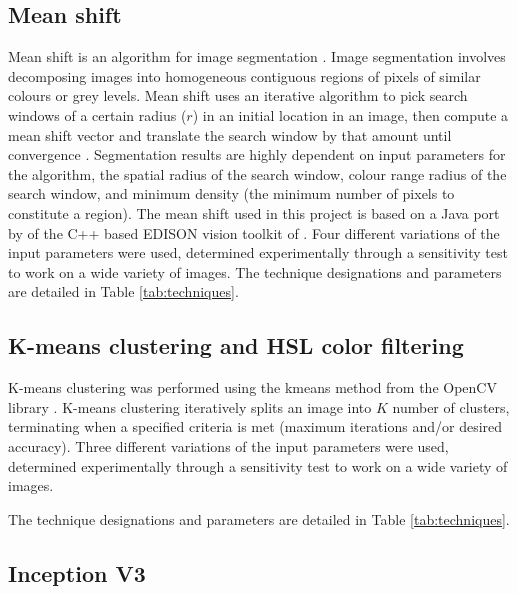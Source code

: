 \documentclass[final,3p,times,authoryear]{elsarticle}
\begin{document}
\subsection{Mean shift}\label{sec:mean}

Mean shift is an algorithm for image segmentation \citep{Comaniciu1997,Comaniciu2002}. Image segmentation involves decomposing images into homogeneous contiguous regions of pixels of similar colours or grey levels. Mean shift uses an iterative algorithm to pick search windows of a certain radius ($r$) in an initial location in an image, then compute a mean shift vector and translate the search window by that amount until convergence \citep{Comaniciu1997}. Segmentation results are highly dependent on input parameters for the algorithm, the spatial radius of the search window, colour range radius of the search window, and minimum density (the minimum number of pixels to constitute a region). The mean shift used in this project is based on a Java port by \cite{Pangburn2002} of the C++ based EDISON vision toolkit of \cite{Christoudias2002}. Four different variations of the input parameters were used, determined experimentally through a sensitivity test to work on a wide variety of images. The technique designations and parameters are detailed in Table \ref{tab:techniques}.



\subsection{K-means clustering and HSL color filtering}\label{sec:kmeans}

K-means clustering was performed using the kmeans method from the OpenCV library \citep{Bradski2000}. K-means clustering iteratively splits an image into $K$ number of clusters, terminating when a specified criteria is met (maximum iterations and/or desired accuracy). Three different variations of the input parameters were used, determined experimentally through a sensitivity test to work on a wide variety of images.

The technique designations and parameters are detailed in Table \ref{tab:techniques}.

	


\subsection{Inception V3}\label{sec:inception}
\end{document}
